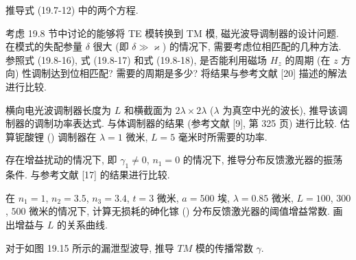 \documentclass{note}
\begin{document}
\begin{exe}
    推导式 (19.7-12) 中的两个方程.
\end{exe}
\begin{pf}
    
\end{pf}

\begin{exe}
    考虑 19.8 节中讨论的能够将 TE 模转换到 TM 模, 磁光波导调制器的设计问题. 在模式的失配参量 $\delta$ 很大 (即 $\delta\gg\varkappa$) 的情况下, 需要考虑位相匹配的几种方法. 参照式 (19.8-16), 式 (19.8-17) 和式 (19.8-18), 是否能利用磁场 $H_z$ 的周期 (在 $z$ 方向) 性调制达到位相匹配? 需要的周期是多少? 将结果与参考文献 [20] 描述的解法进行比较.
\end{exe}
\begin{sol}
\end{sol}

\begin{exe}
    横向电光波调制器长度为 $L$ 和横截面为 $2\lambda\times 2\lambda$ ($\lambda$ 为真空中光的波长), 推导该调制器的调制功率表达式. 与体调制器的结果 (参考文献 [9], 第 325 页) 进行比较. 估算铌酸锂 () 调制器在 $\lambda=1$ 微米, $L=5$ 毫米时所需要的功率.
\end{exe}
\begin{sol}
\end{sol}

\begin{exe}
    存在增益扰动的情况下, 即 $\gamma_1\neq 0$, $n_1=0$ 的情况下, 推导分布反馈激光器的振荡条件. 与参考文献 [17] 的结果进行比较.
\end{exe}
\begin{sol}
    
\end{sol}

\begin{exe}
    在 $n_1=1$, $n_2=3.5$, $n_3=3.4$, $t=3$ 微米, $a=500$ 埃, $\lambda=0.85$ 微米, $L=100$, $300$, $500$ 微米的情况下, 计算无损耗的砷化镓 () 分布反馈激光器的阈值增益常数. 画出增益与 $L$ 的关系曲线.
\end{exe}
\begin{sol}
    
\end{sol}

\begin{exe}
    对于如图 19.15 所示的漏泄型波导, 推导 $TM$ 模的传播常数 $\gamma$.
\end{exe}
\begin{sol}
    
\end{sol}
\end{document}
